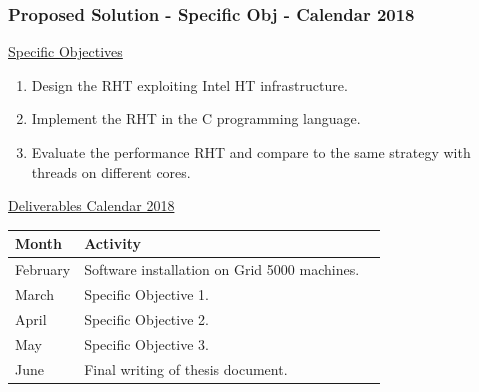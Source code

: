 \documentclass[xcolor=pdftex,dvipsnames,table]{beamer}
\begin{document}
\begin{frame}
	\frametitle{Proposed Solution - Specific Obj - Calendar 2018}
    
    \underline{Specific Objectives} 
    \begin{enumerate}
		\item Design the RHT exploiting Intel HT infrastructure.
		\item Implement the RHT in the C programming language. 
		\item Evaluate the performance RHT and compare to the same strategy with threads on different cores. 
	\end{enumerate} \pause

\underline{Deliverables Calendar 2018} 
\begin{center}
    \begin{tabular}{| l | l | l |} \hline
    	\textbf{Month} & \textbf{Activity} \\ \hline
    	February & Software installation on Grid 5000 machines.  \\ \hline
    	March & Specific Objective 1. \\ \hline
    	April & Specific Objective 2. \\ \hline
    	May & Specific Objective 3. \\ \hline 
        June & Final writing of thesis document. \\ \hline 
    \end{tabular}
\end{center}

\end{frame}

%
%    
%
              
\end{document}

